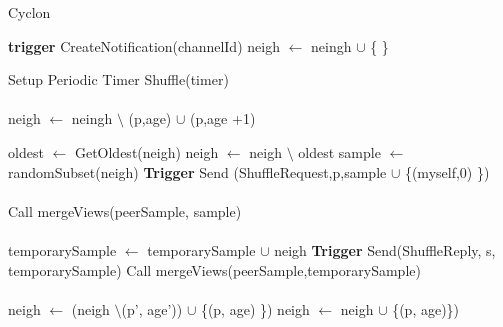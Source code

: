 \begin{algorithm}
   \caption{Cyclon}
    \begin{algorithmic}[1]
        \State \textbf{trigger} CreateNotification(channelId)
            \State neigh $\leftarrow$ neingh $\cup$ \{ \}
        \EndIf
        
        \State Setup Periodic Timer Shuffle(timer)
	  \EndFunction
	          \paragraph{}

            \State neigh $\leftarrow$ neingh $\setminus$ (p,age) $\cup$ (p,age +1)

        \EndFor
            \State  oldest $\leftarrow$ GetOldest(neigh)
            \State  neigh $\leftarrow$ neigh $\setminus$ oldest
            \State sample $\leftarrow$ randomSubset(neigh)
            \State \textbf{Trigger} Send (ShuffleRequest,p,sample $\cup$ \{(myself,0) \})
        \EndIf
        \EndFunction
        \paragraph{}
            \State Call mergeViews(peerSample, sample)
        \EndFunction
                \paragraph{}

            \State temporarySample $\leftarrow$ temporarySample $\cup$ neigh
            \State \textbf{Trigger }Send(ShuffleReply, s, temporarySample)
            \State Call mergeViews(peerSample,temporarySample)
        \EndFunction
                \paragraph{}

                    \State neigh $\leftarrow$ (neigh $\setminus$(p', age')) $\cup$ \{(p, age) \})  \EndIf
                \Else
                        \State neigh $\leftarrow$ neigh $\cup$ \{(p, age)\})  
                    

\end{algorithmic}
\end{algorithm}
